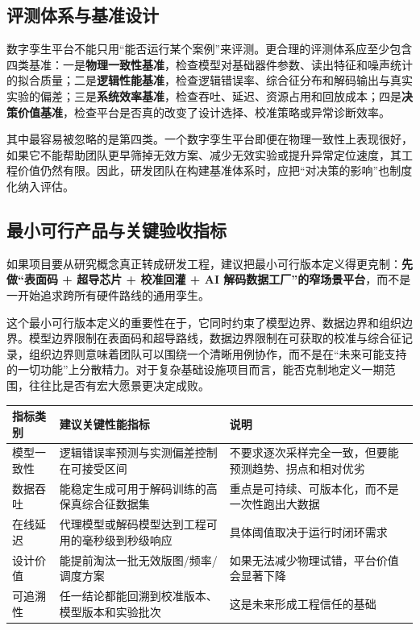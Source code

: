 \documentclass[11pt,a4paper]{article}
\begin{document}
\subsection{评测体系与基准设计}

数字孪生平台不能只用“能否运行某个案例”来评测。更合理的评测体系应至少包含四类基准：一是\textbf{物理一致性基准}，检查模型对基础器件参数、读出特征和噪声统计的拟合质量；二是\textbf{逻辑性能基准}，检查逻辑错误率、综合征分布和解码输出与真实实验的偏差；三是\textbf{系统效率基准}，检查吞吐、延迟、资源占用和回放成本；四是\textbf{决策价值基准}，检查平台是否真的改变了设计选择、校准策略或异常诊断效率。

其中最容易被忽略的是第四类。一个数字孪生平台即便在物理一致性上表现很好，如果它不能帮助团队更早筛掉无效方案、减少无效实验或提升异常定位速度，其工程价值仍然有限。因此，研发团队在构建基准体系时，应把“对决策的影响”也制度化纳入评估。

\subsection{最小可行产品与关键验收指标}

如果项目要从研究概念真正转成研发工程，建议把最小可行版本定义得更克制：\textbf{先做“表面码 + 超导芯片 + 校准回灌 + AI 解码数据工厂”的窄场景平台}，而不是一开始追求跨所有硬件路线的通用孪生。

这个最小可行版本定义的重要性在于，它同时约束了模型边界、数据边界和组织边界。模型边界限制在表面码和超导路线，数据边界限制在可获取的校准与综合征记录，组织边界则意味着团队可以围绕一个清晰用例协作，而不是在“未来可能支持的一切功能”上分散精力。对于复杂基础设施项目而言，能否克制地定义一期范围，往往比是否有宏大愿景更决定成败。

{\small
\begin{longtable}{L{3.1cm}L{4.6cm}L{5.8cm}}
\toprule
指标类别 & 建议关键性能指标 & 说明 \\
\midrule
\endhead
模型一致性 & 逻辑错误率预测与实测偏差控制在可接受区间 & 不要求逐次采样完全一致，但要能预测趋势、拐点和相对优劣 \\
数据吞吐 & 能稳定生成可用于解码训练的高保真综合征数据集 & 重点是可持续、可版本化，而不是一次性跑出大数据 \\
在线延迟 & 代理模型或解码模型达到工程可用的毫秒级到秒级响应 & 具体阈值取决于运行时闭环需求 \\
设计价值 & 能提前淘汰一批无效版图/频率/调度方案 & 如果无法减少物理试错，平台价值会显著下降 \\
可追溯性 & 任一结论都能回溯到校准版本、模型版本和实验批次 & 这是未来形成工程信任的基础 \\
\bottomrule
\end{longtable}
}
\end{document}
